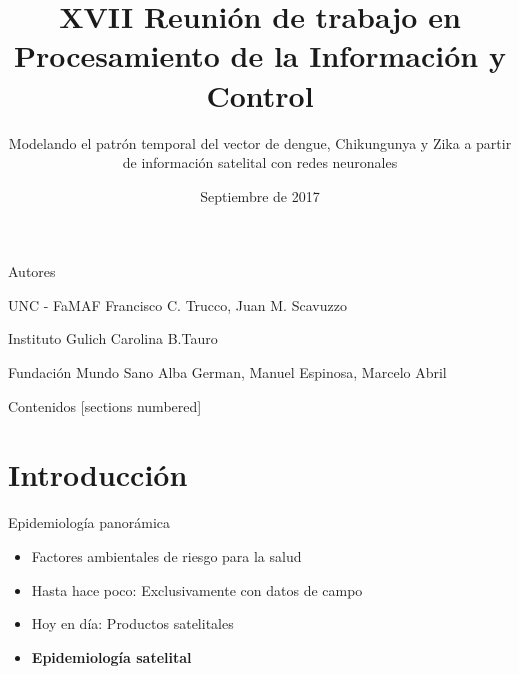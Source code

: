 \documentclass[10pt]{beamer}
\title{XVII Reunión de trabajo en Procesamiento de la Información y Control}
\subtitle{Modelando el patrón temporal del vector de dengue, Chikungunya y Zika
  a partir de información satelital con redes neuronales}
\date{Septiembre de 2017}
\begin{document}
\maketitle

\begin{frame}{Autores}
	\begin{alertblock}{UNC - FaMAF}
    Francisco C. Trucco, Juan M. Scavuzzo
	\end{alertblock}

	\begin{alertblock}{Instituto Gulich}
    Carolina B.Tauro
	\end{alertblock}

	\begin{alertblock}{Fundación Mundo Sano}
    Alba German, Manuel Espinosa, Marcelo Abril
	\end{alertblock}
\end{frame}

\begin{frame}{Contenidos}
  [sections numbered]
  \tableofcontents[hideallsubsections]
\end{frame}

\section{Introducción}

\begin{frame}{Epidemiología panorámica}

  \begin{itemize}[<+->]
  \item Factores ambientales de riesgo para la salud
  \item Hasta hace poco: Exclusivamente con datos de campo
  \item Hoy en día: Productos satelitales
  \item[] \begin{center} \textbf{Epidemiología satelital} \end{center}

  \end{itemize}


\end{frame}
\end{document}
